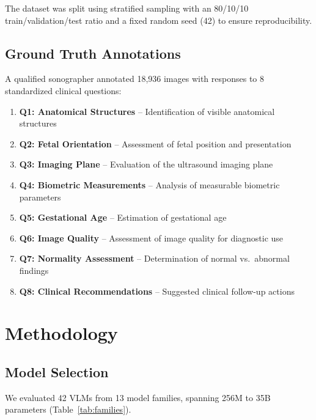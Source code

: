 \documentclass[11pt,a4paper]{article}
\begin{document}
The dataset was split using stratified sampling with an 80/10/10 train/validation/test ratio and a fixed random seed (42) to ensure reproducibility.

\subsection{Ground Truth Annotations}

A qualified sonographer annotated 18,936 images with responses to 8 standardized clinical questions:

\begin{enumerate}
    \item \textbf{Q1: Anatomical Structures} -- Identification of visible anatomical structures
    \item \textbf{Q2: Fetal Orientation} -- Assessment of fetal position and presentation
    \item \textbf{Q3: Imaging Plane} -- Evaluation of the ultrasound imaging plane
    \item \textbf{Q4: Biometric Measurements} -- Analysis of measurable biometric parameters
    \item \textbf{Q5: Gestational Age} -- Estimation of gestational age
    \item \textbf{Q6: Image Quality} -- Assessment of image quality for diagnostic use
    \item \textbf{Q7: Normality Assessment} -- Determination of normal vs.\ abnormal findings
    \item \textbf{Q8: Clinical Recommendations} -- Suggested clinical follow-up actions
\end{enumerate}

\section{Methodology}

\subsection{Model Selection}

We evaluated 42 VLMs from 13 model families, spanning 256M to 35B parameters (Table~\ref{tab:families}).
\end{document}
